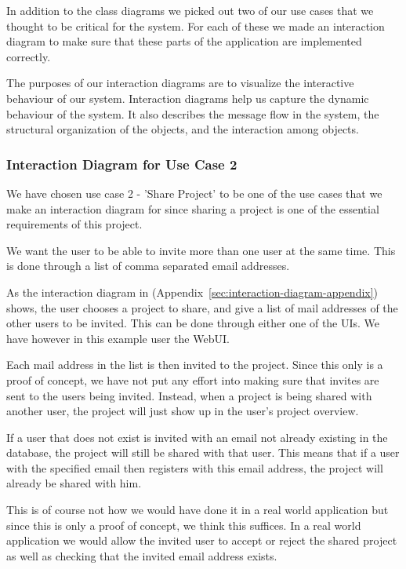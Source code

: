 In addition to the class diagrams we picked out two of our use cases that we thought to be critical for the system. For each of these we made an interaction diagram
to make sure that these parts of the application are implemented correctly. 

The purposes of our interaction diagrams are to visualize the interactive behaviour of our system. Interaction diagrams help us capture the dynamic behaviour of 
the system. It also describes the message flow in the system, the structural organization of the objects, and the interaction among objects.

\subsubsection{Interaction Diagram for Use Case 2}

We have chosen use case 2 - 'Share Project' to be one of the use cases that we make an interaction diagram for since sharing a project is one of the essential
requirements of this project. 

We want the user to be able to invite more than one user at the same time. This is done through a list of comma separated email addresses. 

As the interaction diagram in (Appendix~\ref{sec:interaction-diagram-appendix})
shows, the user chooses a project to share, and give a list of mail addresses of the other users to be invited. This can be done through
either one of the UIs. We have however in this example user the WebUI. 

Each mail address in the list is then invited to the project. Since this only is a proof of concept, we have not put any effort into making sure that invites 
are sent to the users being invited. Instead, when a project is being shared with another user, the project will just show up in the user's project overview.

If a user that does not exist is invited with an email not already existing in the database, the project will still be shared with that user. 
This means that if a user with the specified email then registers with this email address, the project will already be shared with him. 

This is of course not how we would have done it in a real world application but since this is only a proof of concept, we think this suffices. In a 
real world application we would allow the invited user to accept or reject the shared project as well as checking that the invited email address exists.  
